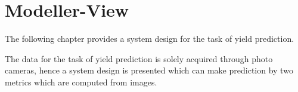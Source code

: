 \section{Modeller-View}

The following chapter provides a system design for the task of yield prediction.

The data for the task of yield prediction is solely acquired through photo cameras, hence a system design is
presented which can make prediction by two metrics which are computed from images.
